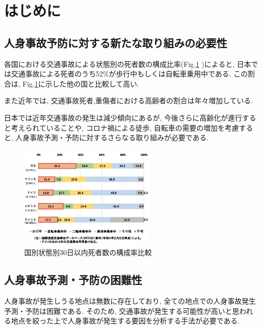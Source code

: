 \documentclass[a4j,8.5pt, twocolumn,fleqn]{jbook}
\begin{document}
\Atitle
\small
\vspace*{-2mm}


\section{はじめに}
\subsection{人身事故予防に対する新たな取り組みの必要性}
各国における交通事故による状態別の死者数の構成比率(Fig.\ref{国別状態別30日以内死者数の構成率比較}
)によると, 日本では交通事故による死者のうち52\%が歩行中もしくは自転車乗用中である. 
この割合は, Fig.\ref{国別状態別30日以内死者数の構成率比較}に示した他の国と比較して高い. 

また近年では, 交通事故死者,重傷者における高齢者の割合は年々増加している\cite{令和3年における交通事故の発生状況等について}. 

日本では近年交通事故の発生は減少傾向にあるが, 今後さらに高齢化が進行すると考えられていることや, コロナ禍による徒歩, 自転車の需要の増加\cite{自転車を巡る現状等}を考慮すると, 人身事故予測・予防に対するさらなる取り組みが必要である. 

\begin{figure}[htb]
    \centering
    \includegraphics[height=50mm]{images/shibou_status.png}
    \vspace{-4mm}
    \caption{国別状態別30日以内死者数の構成率比較\cite{令和3年における交通事故の発生状況等について}}
    \label{国別状態別30日以内死者数の構成率比較}
\end{figure}

\subsection{人身事故予測・予防の困難性}
人身事故が発生しうる地点は無数に存在しており, 全ての地点での人身事故発生予測・予防は困難である. 
そのため, 交通事故が発生する可能性が高いと思われる地点を絞った上で人身事故が発生する要因を分析する手法が必要である. 
\end{document}
